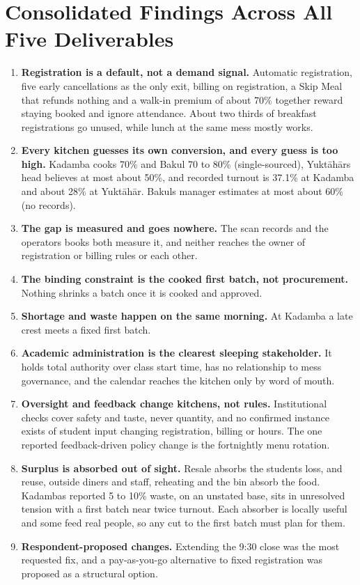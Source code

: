 \documentclass[
  10pt,
  table]{article}
\providecommand{\tightlist}{%
  \setlength{\itemsep}{0pt}\setlength{\parskip}{0pt}}
\renewcommand{\tightlist}{\setlength{\itemsep}{1.5pt}\setlength{\parskip}{0pt}}
\begin{document}
\section{Consolidated Findings Across All Five Deliverables}\label{consolidated-findings-across-all-five-deliverables}

\begin{enumerate}
\def\labelenumi{\arabic{enumi}.}
\tightlist
\item
  \textbf{Registration is a default, not a demand signal.} Automatic registration, five early cancellations as the only exit, billing on registration, a Skip Meal that refunds nothing and a walk-in premium of about 70\% together reward staying booked and ignore attendance. About two thirds of breakfast registrations go unused, while lunch at the same mess mostly works.
\item
  \textbf{Every kitchen guesses its own conversion, and every guess is too high.} Kadamba cooks 70\% and Bakul 70 to 80\% (single-sourced), Yuktāhār\textquotesingle s head believes at most about 50\%, and recorded turnout is 37.1\% at Kadamba and about 28\% at Yuktāhār. Bakul\textquotesingle s manager estimates at most about 60\% (no records).
\item
  \textbf{The gap is measured and goes nowhere.} The scan records and the operators\textquotesingle{} books both measure it, and neither reaches the owner of registration or billing rules or each other.
\item
  \textbf{The binding constraint is the cooked first batch, not procurement.} Nothing shrinks a batch once it is cooked and approved.
\item
  \textbf{Shortage and waste happen on the same morning.} At Kadamba a late crest meets a fixed first batch.
\item
  \textbf{Academic administration is the clearest sleeping stakeholder.} It holds total authority over class start time, has no relationship to mess governance, and the calendar reaches the kitchen only by word of mouth.
\item
  \textbf{Oversight and feedback change kitchens, not rules.} Institutional checks cover safety and taste, never quantity, and no confirmed instance exists of student input changing registration, billing or hours. The one reported feedback-driven policy change is the fortnightly menu rotation.
\item
  \textbf{Surplus is absorbed out of sight.} Resale absorbs the student\textquotesingle s loss, and reuse, outside diners and staff, reheating and the bin absorb the food. Kadamba\textquotesingle s reported 5 to 10\% waste, on an unstated base, sits in unresolved tension with a first batch near twice turnout. Each absorber is locally useful and some feed real people, so any cut to the first batch must plan for them.
\item
  \textbf{Respondent-proposed changes.} Extending the 9:30 close was the most requested fix, and a pay-as-you-go alternative to fixed registration was proposed as a structural option.
\end{enumerate}
\end{document}
